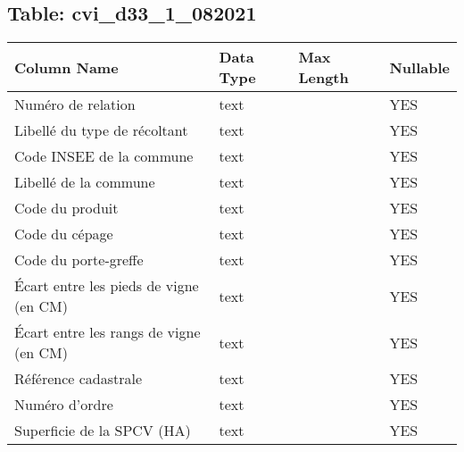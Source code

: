 \subsection*{Table: cvi_d33_1_082021}
\begin{tabular}{llll}
\hline
 Column Name                            & Data Type   & Max Length   & Nullable   \\
\hline
 Numéro de relation                     & text        &              & YES        \\
 Libellé du type de récoltant           & text        &              & YES        \\
 Code INSEE de la commune               & text        &              & YES        \\
 Libellé de la commune                  & text        &              & YES        \\
 Code du produit                        & text        &              & YES        \\
 Code du cépage                         & text        &              & YES        \\
 Code du porte-greffe                   & text        &              & YES        \\
 Écart entre les pieds de vigne (en CM) & text        &              & YES        \\
 Écart entre les rangs de vigne (en CM) & text        &              & YES        \\
 Référence cadastrale                   & text        &              & YES        \\
 Numéro d'ordre                         & text        &              & YES        \\
 Superficie de la SPCV (HA)             & text        &              & YES        \\
\hline
\end{tabular}
